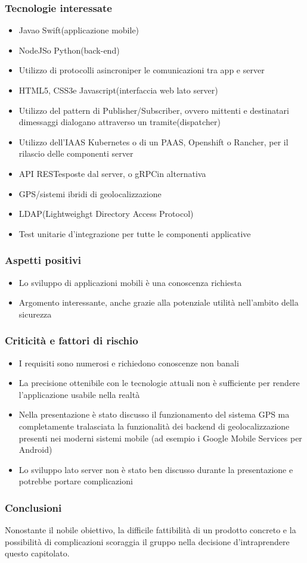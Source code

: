 \subsubsection{Tecnologie interessate}
\begin{itemize}
	\item Java\glo o Swift\glo (applicazione mobile)
	\item NodeJS\glo o Python\glo (back-end\glo)
	\item Utilizzo di protocolli asincroni\glosp per le comunicazioni tra app e server
	\item HTML5\glo, CSS3\glo e Javascript\glo (interfaccia web lato server)
	\item Utilizzo del pattern di Publisher/Subscriber\glo, ovvero mittenti e destinatari dimessaggi dialogano attraverso un tramite(dispatcher)
	\item Utilizzo dell’IAAS Kubernetes o di un PAAS, Openshift o Rancher, per il rilascio delle componenti server
	\item API REST\glosp esposte dal server, o gRPC\glo in alternativa
	\item GPS\glo/sistemi ibridi di geolocalizzazione
	\item LDAP\glo (Lightweighgt Directory Access Protocol)
	\item Test unitari\glosp e d'integrazione per tutte le componenti applicative
\end{itemize}

\subsubsection{Aspetti positivi}
\begin{itemize}
	\item Lo sviluppo di applicazioni mobili è una conoscenza richiesta
	\item Argomento interessante, anche grazie alla potenziale utilità nell'ambito della sicurezza
\end{itemize}

\subsubsection{Criticità e fattori di rischio}
\begin{itemize}
	\item I requisiti sono numerosi e richiedono conoscenze non banali
	\item La precisione ottenibile con le tecnologie attuali non è sufficiente per rendere l’applicazione usabile nella realtà
	\item Nella presentazione è stato discusso il funzionamento del sistema GPS ma completamente tralasciata la funzionalità dei backend di geolocalizzazione presenti nei moderni sistemi mobile (ad esempio i Google Mobile Services per Android)
	\item Lo sviluppo lato server non è stato ben discusso durante la presentazione e potrebbe portare complicazioni
\end{itemize}

\subsubsection{Conclusioni}
Nonostante il nobile obiettivo, la difficile fattibilità di un prodotto concreto e la possibilità di complicazioni scoraggia il gruppo nella decisione d'intraprendere questo capitolato.
